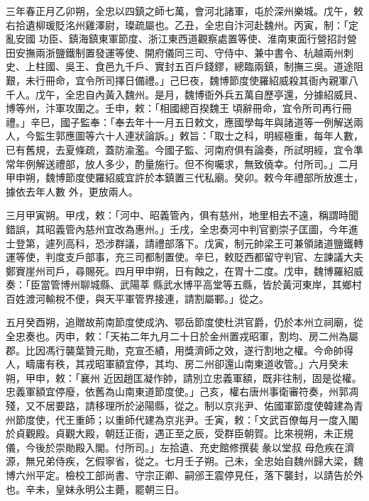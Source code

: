 \begin{pinyinscope}
 三年春正月乙卯朔，全忠以四鎮之師七萬，會河北諸軍，屯於深州樂城。戊午，敕右拾遺柳瑗貶洺州雞澤尉，璨疏屬也。乙丑，全忠自汴河赴魏州。丙寅，制：「定亂安國
 功臣、鎮海鎮東軍節度、浙江東西道觀察處置等使、淮南東面行營招討營田安撫兩浙鹽鐵制置發運等使、開府儀同三司、守侍中、兼中書令、杭越兩州刺史、上柱國、吳王、食邑九千戶、實封五百戶錢鏐，總臨兩鎮，制撫三吳。道途阻艱，未行冊命，宜令所司擇日備禮。」己巳夜，魏博節度使羅紹威殺其衙內親軍八千人。戊午，全忠自內黃入魏州。是月，魏博衙外兵五萬自歷亭還，分據紹威貝、博等州，汴軍攻圍之。壬申，敕：「相國總百揆魏王
 頃辭冊命，宜令所司再行冊禮。」辛巳，國子監奉：「奉去年十一月五日敕文，應國學每年與諸道等一例解送兩人，今監生郭應圖等六十人連狀論訴。」敕旨：「取士之科，明經極重，每年人數，已有舊規，去夏條疏，蓋防渝濫。今國子監、河南府俱有論奏，所試明經，宜令準常年例解送禮部，放人多少，酌量施行。但不徇囑求，無致僥幸。付所司。」二月甲申朔，魏博節度使羅紹威宜許於本鎮置三代私廟。癸卯。敕今年禮部所放進士，據依去年人數
 外，更放兩人。



 三月甲寅朔。甲戌，敕：「河中、昭義管內，俱有慈州，地里相去不遠，稱謂時聞錯誤，其昭義管內慈州宜改為惠州。」壬戌，全忠奏河中判官劉崇子匡圖，今年進士登第，遽列高科，恐涉群議，請禮部落下。戊寅，制元帥梁王可兼領諸道鹽鐵轉運等使，判度支戶部事，充三司都制置使。辛巳，敕貶西都留守判官、左諫議大夫鄭賨崖州司戶，尋賜死。四月甲申朔，日有蝕之，在胃十二度。戊申，魏博羅紹威奏：「臣當管博州聊城縣、武陽莘
 縣武水博平高堂等五縣，皆於黃河東岸，其鄉村百姓渡河輸稅不便，與天平軍管界接連，請割屬鄆。」從之。



 五月癸酉朔，追贈故荊南節度使成汭、鄂岳節度使杜洪官爵，仍於本州立祠廟，從全忠奏也。丙申，敕：「天祐二年九月二十日於金州置戎昭軍，割均、房二州為屬郡。比因馮行襲葉贊元勛，克宣丕績，用獎濟師之效，遂行割地之權。今命帥得人，疇庸有秩，其戎昭軍額宜停，其均、房二州卻還山南東道收管。」六月癸未朔，甲申，敕：「襄州
 近因趙匡凝作帥，請別立忠義軍額，既非往制，固是從權。忠義軍額宜停廢，依舊為山南東道節度使。」己亥，權右唐州事衛審符奏，州郭凋殘，又不居要路，請移理所於泌陽縣，從之。制以京兆尹、佑國軍節度使韓建為青州節度使，代王重師；以重師代建為京兆尹。壬寅，敕：「文武百僚每月一度入閣於貞觀殿。貞觀大殿，朝廷正衙，遇正至之辰，受群臣朝賀。比來視朔，未正規儀，今後於崇勛殿入閣。付所司。」左拾遺、充史館修撰裴彖以堂叔
 母危疾在濟源，無兄弟侍疾，乞假寧省，從之。七月壬子朔。己未，全忠始自魏州歸大梁，魏博六州平定。檢校工部尚書、守宗正卿、嗣邠王震停見任，落下襲封，以請告於外也。辛未，皇妹永明公主薨，罷朝三日。




\end{pinyinscope}
